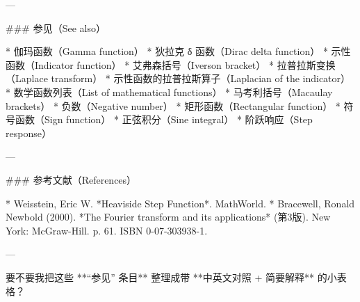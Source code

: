 ---

### 参见（See also）

* 伽玛函数（Gamma function）
* 狄拉克 δ 函数（Dirac delta function）
* 示性函数（Indicator function）
* 艾弗森括号（Iverson bracket）
* 拉普拉斯变换（Laplace transform）
* 示性函数的拉普拉斯算子（Laplacian of the indicator）
* 数学函数列表（List of mathematical functions）
* 马考利括号（Macaulay brackets）
* 负数（Negative number）
* 矩形函数（Rectangular function）
* 符号函数（Sign function）
* 正弦积分（Sine integral）
* 阶跃响应（Step response）

---

### 参考文献（References）

* Weisstein, Eric W. *Heaviside Step Function*. MathWorld.
* Bracewell, Ronald Newbold (2000). *The Fourier transform and its applications* (第3版). New York: McGraw-Hill. p. 61. ISBN 0-07-303938-1.

---

要不要我把这些 **“参见” 条目** 整理成带 **中英文对照 + 简要解释** 的小表格？
